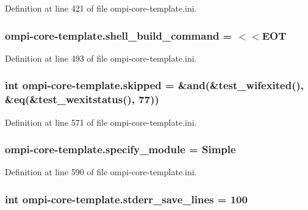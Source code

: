 Definition at line 421 of file ompi-\/core-\/template.\-ini.

\hypertarget{namespaceompi-core-template_a4cde9a1f50b8bdd6e68415d96d2ffdea}{
\subsubsection[{shell\-\_\-build\-\_\-command}]{\setlength{\rightskip}{0pt plus 5cm}ompi-\/core-\/template.\-shell\-\_\-build\-\_\-command = $<$$<$E\-O\-T}}\label{namespaceompi-core-template_a4cde9a1f50b8bdd6e68415d96d2ffdea}


Definition at line 493 of file ompi-\/core-\/template.\-ini.

\hypertarget{namespaceompi-core-template_ab8fdea3dca63a8df3e8266e6fdd62f08}{
\subsubsection[{skipped}]{\setlength{\rightskip}{0pt plus 5cm}int ompi-\/core-\/template.\-skipped = \&and(\&test\-\_\-wifexited(), \&eq(\&test\-\_\-wexitstatus(), 77))}}\label{namespaceompi-core-template_ab8fdea3dca63a8df3e8266e6fdd62f08}


Definition at line 571 of file ompi-\/core-\/template.\-ini.

\hypertarget{namespaceompi-core-template_afe06a465558fa49444bbb29cbd91d4a0}{
\subsubsection[{specify\-\_\-module}]{\setlength{\rightskip}{0pt plus 5cm}ompi-\/core-\/template.\-specify\-\_\-module = Simple}}\label{namespaceompi-core-template_afe06a465558fa49444bbb29cbd91d4a0}


Definition at line 590 of file ompi-\/core-\/template.\-ini.

\hypertarget{namespaceompi-core-template_acd0619b0cba198ab183cab48b2cd2871}{
\subsubsection[{stderr\-\_\-save\-\_\-lines}]{\setlength{\rightskip}{0pt plus 5cm}int ompi-\/core-\/template.\-stderr\-\_\-save\-\_\-lines = 100}}\label{namespaceompi-core-template_acd0619b0cba198ab183cab48b2cd2871}


